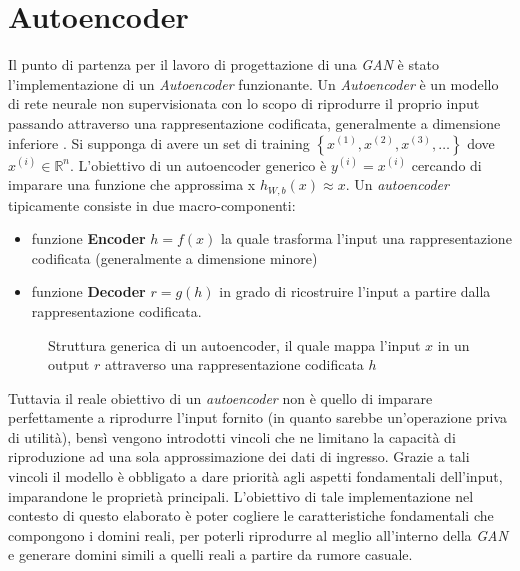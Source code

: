\section{Autoencoder}
\label{autoencoder}
Il punto di partenza per il lavoro di progettazione di una \textit{GAN} è stato l'implementazione di un \textit{Autoencoder} funzionante.  Un \textit{Autoencoder} è un modello di rete neurale non supervisionata con lo scopo di riprodurre il proprio input passando attraverso una rappresentazione codificata, generalmente a dimensione inferiore \cite{MAL-006} \cite{Liou:2008:MWP:1411851.1412074}. Si supponga di avere un set di training $\left\{ x^{(1)}, x^{(2)}, x^{(3)}, \ldots \right\}$ dove $x^{(i)} \in \mathbb{R}^n$. L'obiettivo di un autoencoder generico è $y^{(i)} = x^{(i)}$ cercando di imparare una funzione che approssima x $h_{W,b}(x) \approx x$. Un \textit{autoencoder} tipicamente consiste in due macro-componenti:
\begin{itemize}
\item funzione \textbf{Encoder} $h = f(x)$ la quale trasforma l'input una rappresentazione codificata (generalmente a dimensione minore)
\item funzione \textbf{Decoder} $r = g(h)$ in grado di ricostruire l'input a partire dalla rappresentazione codificata. 
\end{itemize}

\begin{figure}[htb]
    \centering
	
	\caption{Struttura generica di un autoencoder, il quale mappa l'input $x$ in un output $r$ attraverso una rappresentazione codificata $h$}
\label{fig:autoencodergen}
\end{figure}

Tuttavia il reale obiettivo di un \textit{autoencoder }non è quello di imparare perfettamente a riprodurre l'input fornito (in quanto sarebbe un'operazione priva di utilità), bensì vengono introdotti vincoli che ne limitano la capacità di riproduzione ad una sola approssimazione dei dati di ingresso. Grazie a tali vincoli il modello è obbligato a dare priorità agli aspetti fondamentali dell'input, imparandone le proprietà principali. L'obiettivo di tale implementazione nel contesto di questo elaborato è poter cogliere le caratteristiche fondamentali che compongono i domini reali, per poterli riprodurre al meglio all'interno della \textit{GAN} e generare domini simili a quelli reali a partire da rumore casuale.

